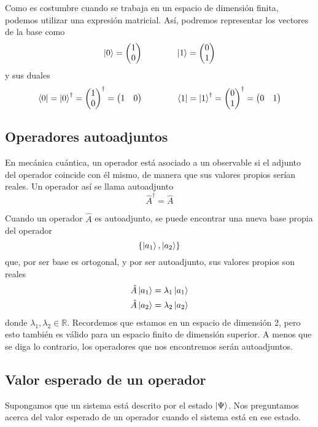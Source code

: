 Como es costumbre cuando se trabaja en un espacio de dimensión finita, podemos
utilizar una expresión matricial. Así, podremos representar los vectores de la
base como
\[
  \ket{0} = \begin{pmatrix}1 \\ 0\end{pmatrix}
  \hspace{4em}
  \ket{1} = \begin{pmatrix}0 \\ 1\end{pmatrix}
\]
y sus duales
\[
  \bra{0} = \ket{0}^\dagger
  = \begin{pmatrix}1 \\ 0\end{pmatrix}^\dagger
  = \begin{pmatrix}1 & 0\end{pmatrix}
  \hspace{4em}
  \bra{1} = \ket{1}^\dagger
  = \begin{pmatrix}0 \\ 1\end{pmatrix}^\dagger
  = \begin{pmatrix}0 & 1\end{pmatrix}
\]

\subsection{Operadores autoadjuntos}
En mecánica cuántica, un operador está asociado a un observable si el adjunto
del operador coincide con él mismo, de manera que sus valores propios serían
reales. Un operador así se llama autoadjunto
\[
  \hat{A}^\dagger = \hat{A}
\]

Cuando un operador $\hat{A}$ es autoadjunto, se puede encontrar una nueva base
propia del operador
\[
  \{\ket{a_1}, \ket{a_2}\}
\]
que, por ser base es ortogonal, y por ser autoadjunto, sus valores propios son
reales
\begin{align*}
  &\hat{A} \ket{a_1} = \lambda_1 \ket{a_1}\\
  &\hat{A} \ket{a_2} = \lambda_2 \ket{a_2}
\end{align*}
donde $\lambda_{1}, \lambda_{2} \in \mathbb{R}$.
Recordemos que estamos en un espacio de dimensión 2, pero esto también es
válido para un espacio finito de dimensión superior.
A menos que se diga lo contrario, los operadores que nos encontremos serán
autoadjuntos.

\subsection{Valor esperado de un operador}
Supongamos que un sistema está descrito por el estado $\ket{\Psi}$. Nos
preguntamos acerca del valor esperado de un operador cuando el sistema está en
ese estado.

